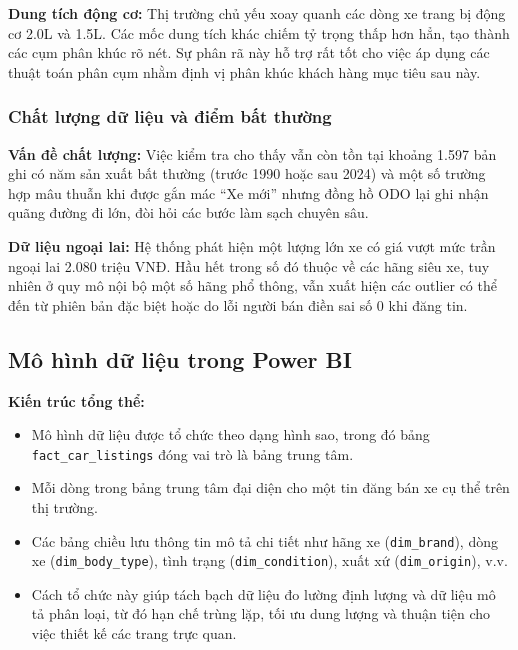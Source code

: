 \textbf{Dung tích động cơ:} Thị trường chủ yếu xoay quanh các dòng xe trang bị động cơ 2.0L và 1.5L. Các mốc dung tích khác chiếm tỷ trọng thấp hơn hẳn, tạo thành các cụm phân khúc rõ nét. Sự phân rã này hỗ trợ rất tốt cho việc áp dụng các thuật toán phân cụm nhằm định vị phân khúc khách hàng mục tiêu sau này.


\subsubsection{Chất lượng dữ liệu và điểm bất thường}

\textbf{Vấn đề chất lượng:} Việc kiểm tra cho thấy vẫn còn tồn tại khoảng 1.597 bản ghi có năm sản xuất bất thường (trước 1990 hoặc sau 2024) và một số trường hợp mâu thuẫn khi được gắn mác ``Xe mới'' nhưng đồng hồ ODO lại ghi nhận quãng đường đi lớn, đòi hỏi các bước làm sạch chuyên sâu.

\textbf{Dữ liệu ngoại lai:} Hệ thống phát hiện một lượng lớn xe có giá vượt mức trần ngoại lai 2.080 triệu VNĐ. Hầu hết trong số đó thuộc về các hãng siêu xe, tuy nhiên ở quy mô nội bộ một số hãng phổ thông, vẫn xuất hiện các outlier có thể đến từ phiên bản đặc biệt hoặc do lỗi người bán điền sai số 0 khi đăng tin.


\subsection{Mô hình dữ liệu trong Power BI}

\noindent\textbf{Kiến trúc tổng thể:}
\begin{itemize}[leftmargin=1.0cm]
    \item Mô hình dữ liệu được tổ chức theo dạng hình sao, trong đó bảng \texttt{fact\_car\_listings} đóng vai trò là bảng trung tâm.
    \item Mỗi dòng trong bảng trung tâm đại diện cho một tin đăng bán xe cụ thể trên thị trường.
    \item Các bảng chiều lưu thông tin mô tả chi tiết như hãng xe (\texttt{dim\_brand}), dòng xe (\texttt{dim\_body\_type}), tình trạng (\texttt{dim\_condition}), xuất xứ (\texttt{dim\_origin}), v.v.
    \item Cách tổ chức này giúp tách bạch dữ liệu đo lường định lượng và dữ liệu mô tả phân loại, từ đó hạn chế trùng lặp, tối ưu dung lượng và thuận tiện cho việc thiết kế các trang trực quan.
\end{itemize}

